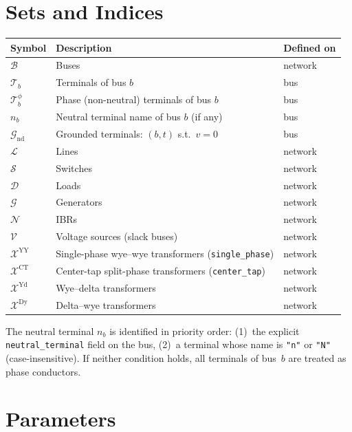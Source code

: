 \documentclass[11pt,a4paper]{article}
\newcommand{\mc}[1]{\mathcal{#1}}
\begin{document}
\section{Sets and Indices}

\begin{center}
\renewcommand{\arraystretch}{1.25}
\begin{tabular}{@{}lll@{}}
\toprule
Symbol & Description & Defined on \\
\midrule
$\mc{B}$           & Buses & network \\
$\mc{T}_b$         & Terminals of bus $b$ & bus \\
$\mc{T}_b^\phi$    & Phase (non-neutral) terminals of bus $b$ & bus \\
$n_b$              & Neutral terminal name of bus $b$ (if any) & bus \\
$\mc{G}_\text{nd}$ & Grounded terminals: $(b,t)$ s.t.\ $v=0$ & bus \\
$\mc{L}$           & Lines & network \\
$\mc{S}$           & Switches & network \\
$\mc{D}$           & Loads & network \\
$\mc{G}$           & Generators & network \\
$\mc{N}$           & IBRs & network \\
$\mc{V}$           & Voltage sources (slack buses) & network \\
$\mc{X}^\text{YY}$ & Single-phase wye--wye transformers (\texttt{single\_phase}) & network \\
$\mc{X}^\text{CT}$ & Center-tap split-phase transformers (\texttt{center\_tap}) & network \\
$\mc{X}^\text{Yd}$ & Wye--delta transformers & network \\
$\mc{X}^\text{Dy}$ & Delta--wye transformers & network \\
\bottomrule
\end{tabular}
\end{center}

The neutral terminal $n_b$ is identified in priority order:
(1)~the explicit \texttt{neutral\_terminal} field on the bus,
(2)~a terminal whose name is \texttt{"n"} or \texttt{"N"} (case-insensitive).
If neither condition holds, all terminals of bus~$b$ are treated as phase
conductors.

\section{Parameters}
\end{document}
